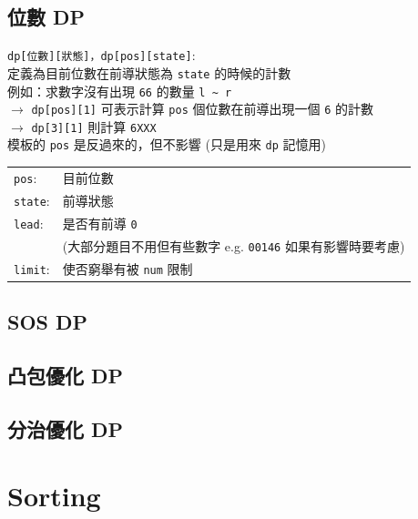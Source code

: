 \documentclass[a4paper,10pt,twocolumn,oneside]{article}
\newcommand{\inputcpp}[1]{}  %
\begin{document}
\subsection{位數 DP}
\noindent
\texttt{dp[位數][狀態]，dp[pos][state]}: \\
定義為目前位數在前導狀態為 \texttt{state} 的時候的計數 \\
例如：求數字沒有出現 \texttt{66} 的數量 \texttt{l \~{} r} \\
$\rightarrow$ \texttt{dp[pos][1]} 可表示計算 \texttt{pos} 個位數在前導出現一個 \texttt{6} 的計數 \\
$\rightarrow$ \texttt{dp[3][1]} 則計算 \texttt{6XXX} \\
模板的 \texttt{pos} 是反過來的，但不影響 (只是用來 \texttt{dp} 記憶用) \\
\begin{tabular}{l l}
  \texttt{pos}:   & 目前位數                                         \\
  \texttt{state}: & 前導狀態                                         \\
  \texttt{lead}:  & 是否有前導 \texttt{0}                             \\
                  & (大部分題目不用但有些數字 e.g. \texttt{00146} 如果有影響時要考慮) \\
  \texttt{limit}: & 使否窮舉有被 \texttt{num} 限制                       \\
\end{tabular}
\inputcpp{DP/digit.cpp}

\subsection{SOS DP}
\inputcpp{DP/sos.cpp}

\subsection{凸包優化 DP}
\inputcpp{DP/lowConvexHull.cpp}

\subsection{分治優化 DP}
\inputcpp{DP/dacOpt.cpp}




\section{Sorting}
\end{document}
